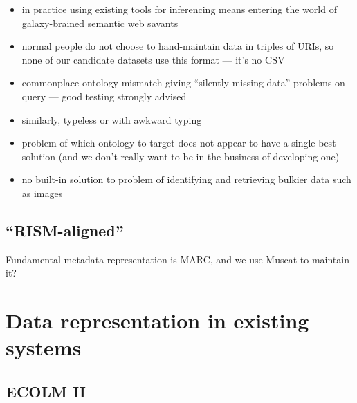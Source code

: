 \documentclass[sigconf, nonacm=true]{acmart}
\begin{document}
\begin{sloppypar}
  \begin{itemize}
    \item in practice using existing tools for inferencing means
      entering the world of galaxy-brained semantic web savants
    \item normal people do not choose to hand-maintain data in triples
      of URIs, so none of our candidate datasets use this format ---
      it's no CSV
    \item commonplace ontology mismatch giving ``silently missing
      data'' problems on query --- good testing strongly advised
    \item similarly, typeless or with awkward typing
    \item problem of which ontology to target does not appear to have
      a single best solution (and we don't really want to be in the
      business of developing one)
    \item no built-in solution to problem of identifying and
      retrieving bulkier data such as images
  \end{itemize}

  \subsection{``RISM-aligned''}

  Fundamental metadata representation is MARC, and we use Muscat to
  maintain it? 
  
  \clearpage

  \section{Data representation in existing systems}
  
  \subsection{ECOLM II}\label{ecolm-data}
  

\end{sloppypar}
\end{document}
